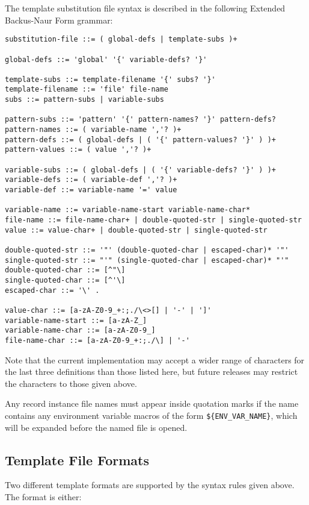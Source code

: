The template substitution file syntax is described in the following Extended Backus-Naur Form grammar:

\begin{verbatim}
substitution-file ::= ( global-defs | template-subs )+

global-defs ::= 'global' '{' variable-defs? '}'

template-subs ::= template-filename '{' subs? '}'
template-filename ::= 'file' file-name
subs ::= pattern-subs | variable-subs

pattern-subs ::= 'pattern' '{' pattern-names? '}' pattern-defs?
pattern-names ::= ( variable-name ','? )+
pattern-defs ::= ( global-defs | ( '{' pattern-values? '}' ) )+
pattern-values ::= ( value ','? )+

variable-subs ::= ( global-defs | ( '{' variable-defs? '}' ) )+
variable-defs ::= ( variable-def ','? )+
variable-def ::= variable-name '=' value

variable-name ::= variable-name-start variable-name-char*
file-name ::= file-name-char+ | double-quoted-str | single-quoted-str
value ::= value-char+ | double-quoted-str | single-quoted-str

double-quoted-str ::= '"' (double-quoted-char | escaped-char)* '"'
single-quoted-str ::= "'" (single-quoted-char | escaped-char)* "'"
double-quoted-char ::= [^"\]
single-quoted-char ::= [^'\]
escaped-char ::= '\' .

value-char ::= [a-zA-Z0-9_+:;./\<>[] | '-' | ']'
variable-name-start ::= [a-zA-Z_]
variable-name-char ::= [a-zA-Z0-9_]
file-name-char ::= [a-zA-Z0-9_+:;./\] | '-'
\end{verbatim}

Note that the current implementation may accept a wider range of characters for the last three definitions than those listed here, but future releases may restrict the characters to those given above.

Any record instance file names must appear inside quotation marks if the name contains any environment variable macros of the form \verb|${ENV_VAR_NAME}|, which will be expanded before the named file is opened.

\subsection{Template File Formats}

Two different template formats are supported by the syntax rules given above.
The format is either:


